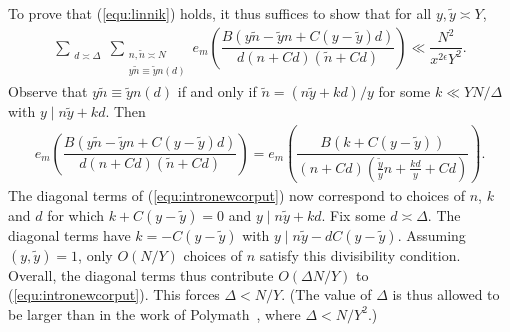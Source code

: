 \documentclass{amsart}
\numberwithin{equation}{section}
\begin{document}
\endgroup
To prove that (\ref{equ:linnik}) holds, it thus suffices to show that for all $y, \widetilde{y} \asymp Y$, 
\begin{align} \label{equ:intronewcorput}
   \sum_{\substack{d \asymp \Delta}} \sum_{\substack{n, \widetilde{n}\asymp N  \\  y\widetilde{n} \equiv \widetilde{y} n (d)}}  e_{m}\left(\dfrac{B(y\widetilde{n} - \widetilde{y}n+C(y-\widetilde{y})d) }{d(n+Cd)(\widetilde{n}+Cd)}   \right) \ll \dfrac{ N^2}{x^{2\epsilon} Y^2}.
\end{align}
Observe that $y\widetilde{n} \equiv \widetilde{y} n (d)$ if and only if $\widetilde{n} = (n \widetilde{y} + kd)/y$ for some $k \ll Y N/\Delta$ with $y \mid n \widetilde{y} +kd$.  Then 
\begin{align*}
e_{m}\left(\dfrac{B(y\widetilde{n} - \widetilde{y}n+C(y-\widetilde{y})d) }{d(n+Cd)(\widetilde{n}+Cd)}   \right) = e_{m}\left(\dfrac{B(k+C(y-\widetilde{y})) }{(n+Cd)(\frac{\widetilde{y}}{y}n + \frac{kd}{y}+Cd)}   \right).
\end{align*}
The diagonal terms of  (\ref{equ:intronewcorput}) now correspond to choices of $n$, $k$ and $d$ for which $k+C(y - \widetilde{y}) = 0$ and $y \mid n \widetilde{y} + kd$. Fix some $d \asymp \Delta$. The diagonal terms have $k = -C(y - \widetilde{y})$ with $y \mid n \widetilde{y} - d  C(y - \widetilde{y})$.  Assuming $(y, \widetilde{y})=1$, only $O(N/Y)$ choices of $n$ satisfy this divisibility condition. Overall, the diagonal terms thus contribute $O(\Delta N/Y)$ to (\ref{equ:intronewcorput}). This forces $\Delta < N/Y$. (The value of $\Delta$ is thus allowed to be larger than in the work of Polymath~\cite{Polymath:2014:EDZ}, where $\Delta < N/Y^2$.)
\end{document}
